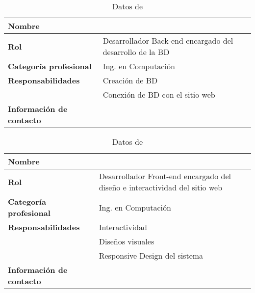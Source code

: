 	\begin{table}[h!]
		\centering
		\begin{tabular}{|l|p{10cm}|}
			\hline
			\textbf{Nombre}                  & \eAuthor                                                 \\
			\hline
			\textbf{Rol}                     & Desarrollador Back-end encargado del desarrollo de la BD \\
			\hline
			\textbf{Categoría profesional}   & Ing. en Computación                                      \\
			\hline
			\textbf{Responsabilidades}       & Creación de BD                                           \\
			                                 & Conexión de BD con el sitio web                          \\
			\hline
			\textbf{Información de contacto} & \eAuthorMail                                             \\
			\hline
		\end{tabular}
		\caption{Datos de \eAuthor}
	\end{table}

	\begin{table}[h!]
		\centering
		\begin{tabular}{|l|p{10cm}|}
			\hline
			\textbf{Nombre}                  & \bAuthor                                                                    \\
			\hline
			\textbf{Rol}                     & Desarrollador Front-end encargado del diseño e interactividad del sitio web \\
			\hline
			\textbf{Categoría profesional}   & Ing. en Computación                                                         \\
			\hline
			\textbf{Responsabilidades}       & Interactividad                                                              \\
			                                 & Diseños visuales                                                            \\
			                                 & Responsive Design del sistema                                               \\
			\hline
			\textbf{Información de contacto} & \bAuthorMail                                                                \\
			\hline
		\end{tabular}
		\caption{Datos de \bAuthor}
	\end{table}

